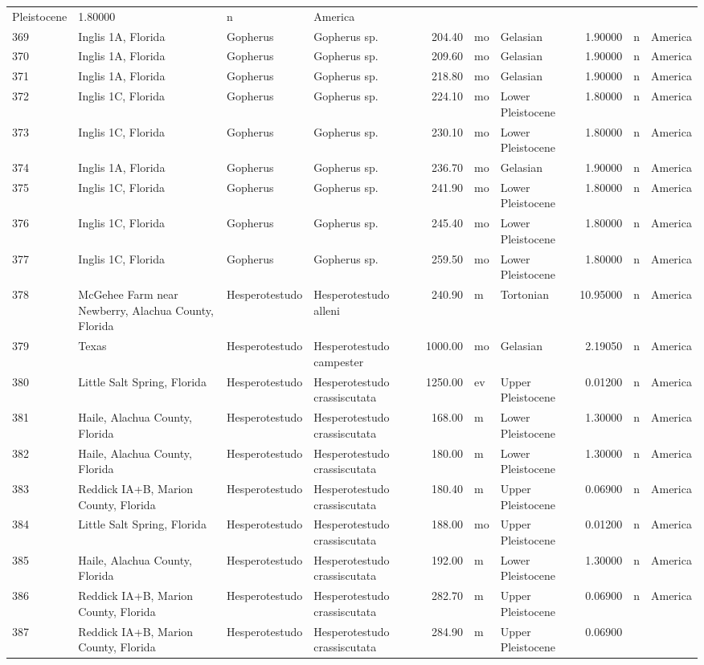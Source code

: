 \documentclass[]{article}
\begin{document}
\begin{longtable}[]{@{}llllrllrll@{}}
Pleistocene & 1.80000 & n & America\tabularnewline
369 & Inglis 1A, Florida & Gopherus & Gopherus sp. & 204.40 & mo &
Gelasian & 1.90000 & n & America\tabularnewline
370 & Inglis 1A, Florida & Gopherus & Gopherus sp. & 209.60 & mo &
Gelasian & 1.90000 & n & America\tabularnewline
371 & Inglis 1A, Florida & Gopherus & Gopherus sp. & 218.80 & mo &
Gelasian & 1.90000 & n & America\tabularnewline
372 & Inglis 1C, Florida & Gopherus & Gopherus sp. & 224.10 & mo & Lower
Pleistocene & 1.80000 & n & America\tabularnewline
373 & Inglis 1C, Florida & Gopherus & Gopherus sp. & 230.10 & mo & Lower
Pleistocene & 1.80000 & n & America\tabularnewline
374 & Inglis 1A, Florida & Gopherus & Gopherus sp. & 236.70 & mo &
Gelasian & 1.90000 & n & America\tabularnewline
375 & Inglis 1C, Florida & Gopherus & Gopherus sp. & 241.90 & mo & Lower
Pleistocene & 1.80000 & n & America\tabularnewline
376 & Inglis 1C, Florida & Gopherus & Gopherus sp. & 245.40 & mo & Lower
Pleistocene & 1.80000 & n & America\tabularnewline
377 & Inglis 1C, Florida & Gopherus & Gopherus sp. & 259.50 & mo & Lower
Pleistocene & 1.80000 & n & America\tabularnewline
378 & McGehee Farm near Newberry, Alachua County, Florida &
Hesperotestudo & Hesperotestudo alleni & 240.90 & m & Tortonian &
10.95000 & n & America\tabularnewline
379 & Texas & Hesperotestudo & Hesperotestudo campester & 1000.00 & mo &
Gelasian & 2.19050 & n & America\tabularnewline
380 & Little Salt Spring, Florida & Hesperotestudo & Hesperotestudo
crassiscutata & 1250.00 & ev & Upper Pleistocene & 0.01200 & n &
America\tabularnewline
381 & Haile, Alachua County, Florida & Hesperotestudo & Hesperotestudo
crassiscutata & 168.00 & m & Lower Pleistocene & 1.30000 & n &
America\tabularnewline
382 & Haile, Alachua County, Florida & Hesperotestudo & Hesperotestudo
crassiscutata & 180.00 & m & Lower Pleistocene & 1.30000 & n &
America\tabularnewline
383 & Reddick IA+B, Marion County, Florida & Hesperotestudo &
Hesperotestudo crassiscutata & 180.40 & m & Upper Pleistocene & 0.06900
& n & America\tabularnewline
384 & Little Salt Spring, Florida & Hesperotestudo & Hesperotestudo
crassiscutata & 188.00 & mo & Upper Pleistocene & 0.01200 & n &
America\tabularnewline
385 & Haile, Alachua County, Florida & Hesperotestudo & Hesperotestudo
crassiscutata & 192.00 & m & Lower Pleistocene & 1.30000 & n &
America\tabularnewline
386 & Reddick IA+B, Marion County, Florida & Hesperotestudo &
Hesperotestudo crassiscutata & 282.70 & m & Upper Pleistocene & 0.06900
& n & America\tabularnewline
387 & Reddick IA+B, Marion County, Florida & Hesperotestudo &
Hesperotestudo crassiscutata & 284.90 & m & Upper Pleistocene & 0.06900

\end{longtable}
\end{document}
